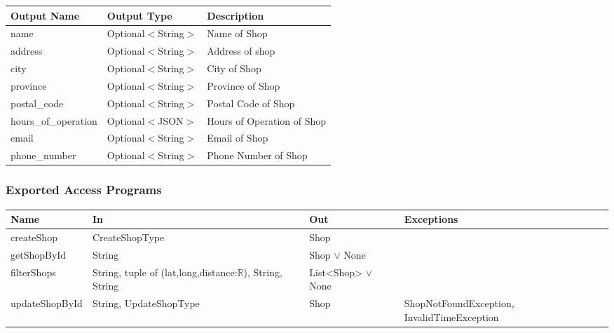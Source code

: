 \documentclass[12pt, titlepage]{article}
\begin{document}
\begin{table}[H]
	\begin{tabular}{|p{}|p{}|p{}|}
		\hline
		\textbf{Output Name} & \textbf{Output Type} & \textbf{Description}       \\
		\hline
		name                 & Optional$<$String$>$ & Name of Shop               \\
		\hline
		address              & Optional$<$String$>$ & Address of shop            \\
		\hline
		city                 & Optional$<$String$>$ & City of Shop               \\
		\hline
		province             & Optional$<$String$>$ & Province of Shop           \\
		\hline
		postal\_code         & Optional$<$String$>$ & Postal Code of Shop        \\
		\hline
		hours\_of\_operation & Optional$<$JSON$>$   & Hours of Operation of Shop \\
		\hline
		email                & Optional$<$String$>$ & Email of Shop              \\
		\hline
		phone\_number        & Optional$<$String$>$ & Phone Number of Shop       \\
		\hline
	\end{tabular}
\end{table}

\subsubsection{Exported Access Programs}

\begin{center}
	\begin{adjustbox}{width=\textwidth}
		\begin{tabular}{llll}
			\hline
			\textbf{Name}  & \textbf{In}                                                       & \textbf{Out}           & \textbf{Exceptions}                         \\
			\hline
			createShop     & CreateShopType                                                    & Shop                   & ~                                           \\
			getShopById    & String                                                            & Shop $\lor$ None       & ~                                           \\
			filterShops    & String, tuple of (lat,long,distance:$\mathbb{R}$), String, String & List<Shop> $\lor$ None & ~                                           \\
			updateShopById & String, UpdateShopType                                            & Shop                   & ShopNotFoundException, InvalidTimeException \\
			\hline
		\end{tabular}
	\end{adjustbox}
\end{center}
\end{document}
